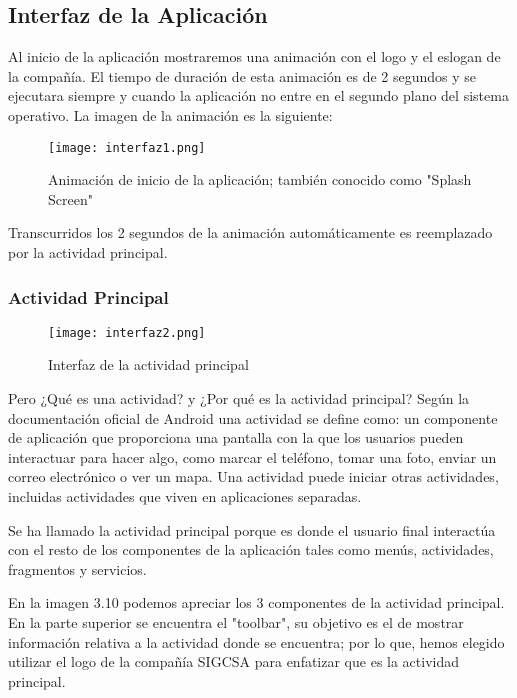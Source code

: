\subsection{Interfaz de la Aplicación}

\par
Al inicio de la aplicación mostraremos una animación con el logo y el eslogan de la compañía. El tiempo de duración de esta animación es de 2 segundos y se ejecutara siempre y cuando la aplicación no entre en el segundo plano del sistema operativo. La imagen de la animación es la siguiente:

\begin{figure}[H]
	\centering
	\texttt{[image: interfaz1.png]}
	\caption{Animación de inicio de la aplicación; también conocido como "Splash Screen"}
\end{figure}

\par \noindent
Transcurridos los 2 segundos de la animación automáticamente es reemplazado por la actividad principal.  

\subsubsection{Actividad Principal}

\begin{figure}[H]
	\centering
	\texttt{[image: interfaz2.png]}
	\caption{Interfaz de la actividad principal}
\end{figure}

\par 
Pero ¿Qué es una actividad? y ¿Por qué es la actividad principal? Según la documentación oficial de Android una actividad se define como: un componente de aplicación que proporciona una pantalla con la que los usuarios pueden interactuar para hacer algo, como marcar el teléfono, tomar una foto, enviar un correo electrónico o ver un mapa. Una actividad puede iniciar otras actividades, incluidas actividades que viven en aplicaciones separadas.\cite{androidapp}

\par \noindent
Se ha llamado la actividad principal porque es donde el usuario final interactúa con el resto de los componentes de la aplicación tales como menús, actividades, fragmentos y servicios. 

\par \noindent
En la imagen 3.10 podemos apreciar los 3 componentes de la actividad principal. En la parte superior se encuentra el "toolbar", su objetivo es el de mostrar información relativa a la actividad donde se encuentra; por lo que, hemos elegido utilizar el logo de la compañía SIGCSA para enfatizar que es la actividad principal. 

